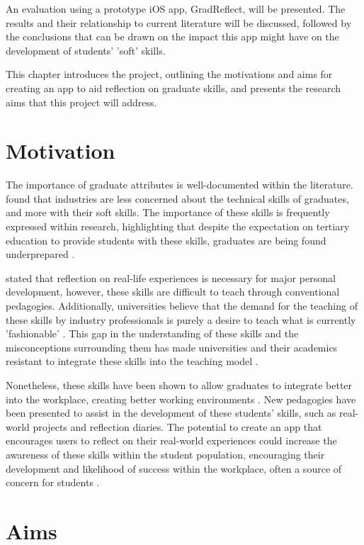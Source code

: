 \documentclass{l4proj}
\begin{document}
An evaluation using a prototype iOS app, GradReflect, will be presented. The results and their relationship to current literature will be discussed, followed by the conclusions that can be drawn on the impact this app might have on the development of students' 'soft' skills.

This chapter introduces the project, outlining the motivations and aims for creating an app to aid reflection on graduate skills, and presents the research aims that this project will address.


\section{Motivation}
The importance of graduate attributes is well-documented within the literature. \citet{litchfield_contextualising_2010} found that industries are less concerned about the technical skills of graduates, and more with their soft skills. The importance of these skills is frequently expressed within research, highlighting that despite the expectation on tertiary education to provide students with these skills, graduates are being found underprepared \citep{stevens_industry_2016}. 

\citet{abernethy_teaching_2009} stated that reflection on real-life experiences is necessary for major personal development, however, these skills are difficult to teach through conventional pedagogies. Additionally, universities believe that the demand for the teaching of these skills by industry professionals is purely a desire to teach what is currently 'fashionable' \citep{stevens_industry_2016}. This gap in the understanding of these skills and the misconceptions surrounding them has made universities and their academics resistant to integrate these skills into the teaching model \citep{barr_2019}. 

Nonetheless, these skills have been shown to allow graduates to integrate better into the workplace, creating better working environments \citep{stevens_industry_2016}. New pedagogies have been presented to assist in the development of these students' skills, such as real-world projects and reflection diaries. The potential to create an app that encourages users to reflect on their real-world experiences could increase the awareness of these skills within the student population, encouraging their development and likelihood of success within the workplace, often a source of concern for students \citep{stevens_industry_2016}.


\section{Aims} \label{IntroAims}
\end{document}
